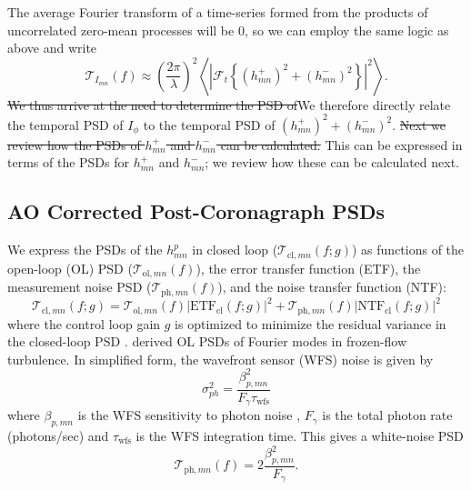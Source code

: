 \documentclass[10pt,preprint]{aastex631}
\newcommand{\mpfadd}[1]{\textcolor{avocado}{#1}}
\newcommand{\mpfrmv}[1]{\textcolor{avocado}{\sout{#1}}}
\begin{document}
The average Fourier transform of a time-series formed from the products of uncorrelated zero-mean processes will be 0, so we can employ the same logic as above and write
\begin{equation}
\mathcal{T}_{I_{mn}}(f) \approx \left(\frac{2\pi}{\lambda}\right)^2  \left\langle \left| \mathcal{F}_t\left\{   (h_{mn}^{+})^2 + (h_{mn}^{-})^2  \right\} \right|^2 \right\rangle  .
\label{eqn:psd_h2}
\end{equation}
\mpfrmv{We thus arrive at the need to determine the PSD of}\mpfadd{We therefore directly relate the temporal PSD of $I_\phi$ to the temporal PSD of} $(h_{mn}^{+})^2 + (h_{mn}^{-})^2$.  \mpfrmv{Next we review how the PSDs of $h_{mn}^{+}$ and $h_{mn}^{-}$ can be calculated.}  \mpfadd{This can be expressed in terms of the PSDs for $h_{mn}^{+}$ and $h_{mn}^{-}$; we review how these can be calculated next.}

\subsection{AO Corrected Post-Coronagraph PSDs}

We express the PSDs of the $h_{mn}^p$ in closed loop ($\mathcal{T}_{\mathrm{cl},mn}(f;g)$) as functions of the open-loop (OL) PSD ($\mathcal{T}_{\mathrm{ol},mn}(f)$), the error transfer function (ETF), the measurement noise PSD ($\mathcal{T}_{\mathrm{ph},mn}(f)$), and the noise transfer function (NTF): 
\begin{equation}
\mathcal{T}_{\mathrm{cl},mn}(f;g) = \mathcal{T}_{\mathrm{ol},mn}(f) \left| \mbox{ETF}_{\mathrm{cl}}(f;g) \right|^2 + \mathcal{T}_{\mathrm{ph},mn}(f) \left| \mbox{NTF}_{\mathrm{cl}}(f;g) \right|^2 
\label{eqn:cl_psd}
\end{equation}
where the control loop gain $g$ is optimized to minimize the residual variance in the closed-loop PSD \citep{1999aoa..book.....R_ch6,2016ApOpt..55..323P}. \citet{2018JATIS...4a9001M} derived OL PSDs of Fourier modes in frozen-flow turbulence.  In simplified form, the wavefront sensor (WFS) noise is given by
\begin{equation}
\sigma_{ph}^2 = \frac{\beta_{p,mn}^2}{F_\gamma \tau_\mathrm{wfs}}
\label{eqn:photon_noise}
\end{equation}
where $\beta_{p,mn}$ is the WFS sensitivity to photon noise \citep{2005ApJ...629..592G}, $F_\gamma$ is the total photon rate (photons/sec) and $\tau_\mathrm{wfs}$ is the WFS integration time.  This gives a white-noise PSD
\begin{equation}
\mathcal{T}_{\mathrm{ph},mn}(f) = 2\frac{\beta_{p,mn}^2}{F_\gamma }.
\end{equation}
\end{document}
